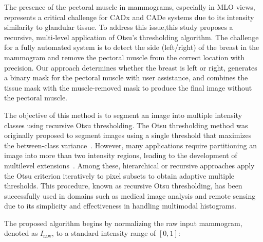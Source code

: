 \documentclass[runningheads]{llncs}
\begin{document}
The presence of the pectoral muscle in mammograms, especially in
\ac{MLO} views, represents a critical challenge for \ac{CADx} and
\ac{CADe} systems due to its intensity similarity to glandular
tissue. To address this issue,this study proposes a recursive,
multi-level application of Otsu's thresholding algorithm. The
challenge for a fully automated system is to detect the side
(left/right) of the breast in the mammogram and remove the pectoral
muscle from the correct location with precision. Our approach
determines whether the breast is left or right, generates a binary
mask for the pectoral muscle with user assistance, and combines the
tissue mask with the muscle-removed mask to produce the final image
without the pectoral muscle.

The objective of this method is to segment an image into multiple
intensity classes using recursive Otsu thresholding. The Otsu
thresholding method was originally proposed to segment images using a
single threshold that maximizes the between-class
variance~\cite{otsu1979}. However, many applications require
partitioning an image into more than two intensity regions, leading to
the development of multilevel
extensions~\cite{bioengineering11101034}. Among these, hierarchical or
recursive approaches apply the Otsu criterion iteratively to pixel
subsets to obtain adaptive multiple thresholds. This procedure, known
as recursive Otsu thresholding, has been successfully used in domains
such as medical image analysis and remote sensing due to its
simplicity and effectiveness in handling multimodal histograms.

The proposed algorithm begins by normalizing the raw input mammogram,
denoted as \( I_{\text{raw}} \), to a standard intensity range of
\([0, 1]\):

\end{document}

